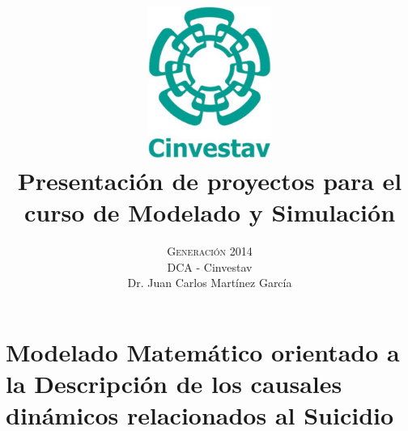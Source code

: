 



\title{\vspace{-15mm} \includegraphics[width=0.3\textwidth]{imagenes/cinvestav.jpg} \\[1cm] \fontsize{24pt}{10pt}\selectfont\textbf{Presentación de proyectos para el curso de Modelado y Simulación}}

\author{
\large \textsc{Generación 2014}\\[2mm]
\normalsize DCA - Cinvestav \\
\normalsize Dr. Juan Carlos Martínez García
\vspace{-5mm}
}
\date{}




    \maketitle

    \thispagestyle{fancy}
    \tableofcontents


    \chapter{Modelado Matemático orientado a la Descripción de los causales dinámicos relacionados al Suicidio}

